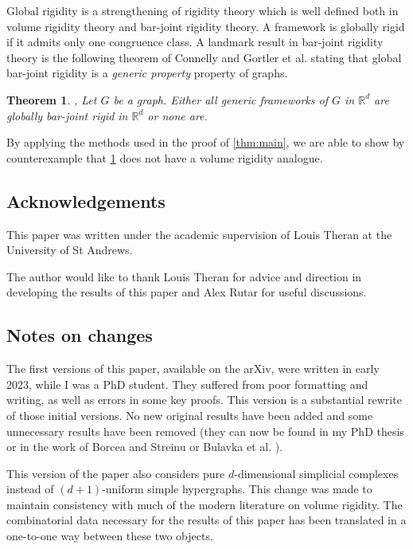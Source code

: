 \documentclass[11pt]{amsart}
\newtheorem{theorem}{Theorem}[section]
\theoremstyle{definition}
\theoremstyle{remark}
\begin{document}
Global rigidity is a strengthening of rigidity theory which is well defined both in volume rigidity theory and bar-joint rigidity theory.
A framework is globally rigid if it admits only one congruence class.
A landmark result in bar-joint rigidity theory is the following theorem of Connelly and Gortler et al. stating that global bar-joint rigidity is a \textit{generic property} property of graphs.

\begin{theorem}\label{thm:CGHT}\cite{connelly2005generic},\cite{gortler2010characterizing}
    Let $G$ be a graph.
    Either all generic frameworks of $G$ in $\mathbb{R}^d$ are globally bar-joint rigid in $\mathbb{R}^d$ or none are.
\end{theorem}

By applying the methods used in the proof of \cref{thm:main}, we are able to show by counterexample that \cref{thm:CGHT} does not have a volume rigidity analogue.

\subsection{Acknowledgements}

This paper was written under the academic supervision of Louis Theran at the University of St Andrews.

The author would like to thank Louis Theran for advice and direction in developing the results of this paper and Alex Rutar for useful discussions.

\subsection{Notes on changes}

The first versions of this paper, available on the arXiv, were written in early 2023, while I was a PhD student.
They suffered from poor formatting and writing, as well as errors in some key proofs.
This version is a substantial rewrite of those initial versions.
No new original results have been added and some unnecessary results have been removed (they can now be found in my PhD thesis \cite{southgate2024volume} or in the work of Borcea and Streinu \cite{borcea2002number} or Bulavka et al. \cite{bulavka2022volume}).

This version of the paper also considers pure $d$-dimensional simplicial complexes instead of $(d+1)$-uniform simple hypergraphs.
This change was made to maintain consistency with much of the modern literature on volume rigidity.
The combinatorial data necessary for the results of this paper has been translated in a one-to-one way between these two objects.
\end{document}
